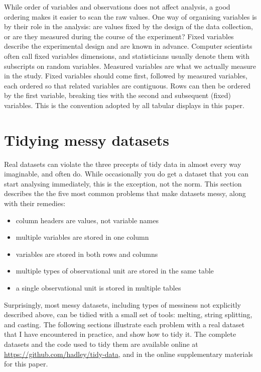 \documentclass[article]{jss}
\begin{document}
While order of variables and observations does not affect analysis, a good ordering makes it easier to scan the raw values. One way of organising variables is by their role in the analysis: are values fixed by the design of the data collection, or are they measured during the course of the experiment? Fixed variables describe the experimental design and are known in advance. Computer scientists often call fixed variables dimensions, and statisticians usually denote them with subscripts on random variables. Measured variables are what we actually measure in the study. Fixed variables should come first, followed by measured variables, each ordered so that related variables are contiguous. Rows can then be ordered by the first variable, breaking ties with the second and subsequent (fixed) variables. This is the convention adopted by all tabular displays in this paper. 

\section{Tidying messy datasets}
\label{sec:tidying}

Real datasets can violate the three precepts of tidy data in almost every way imaginable, and often do. While occasionally you do get a dataset that you can start analysing immediately, this is the exception, not the norm.  This section describes the the five most common problems that make datasets messy, along with their remedies:

\begin{itemize}
  \item column headers are values, not variable names
  \item multiple variables are stored in one column
  \item variables are stored in both rows and columns
  \item multiple types of observational unit are stored in the same table
  \item a single observational unit is stored in multiple tables
\end{itemize}

Surprisingly, most messy datasets, including types of messiness not explicitly described above, can be tidied with a small set of tools: melting, string splitting, and casting. The following sections illustrate each problem with a real dataset that I have encountered in practice, and show how to tidy it. The complete datasets and the  code used to tidy them are available online at \url{https://github.com/hadley/tidy-data}, and in the online supplementary materials for this paper.
\end{document}

